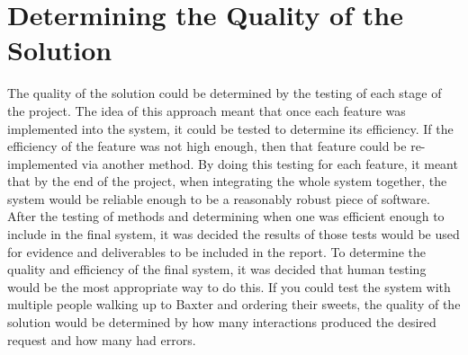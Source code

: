 \section{Determining the Quality of the Solution}
The quality of the solution could be determined by the testing of each stage of the
project. The idea of this approach meant that once each feature was implemented into the system, it could be tested to determine its efficiency. If the efficiency of the feature was not high enough, then that feature could be re-implemented via another method. By doing this testing for each feature, it meant that by the end of the project, when integrating the whole system together, the system would be reliable enough to be a reasonably robust piece of software. After the testing of methods and determining when one was efficient enough to include in the final system, it was decided the results of those tests would be used for evidence and deliverables to be included in the report.
\newline\newline
To determine the quality and efficiency of the final system, it was decided that human testing would be the most appropriate way to do this. If you could test the system with multiple people walking up to Baxter and ordering their sweets, the quality of the solution would be determined by how many interactions produced the desired request and how many had errors.
\let\cleardoublepage\clearpage